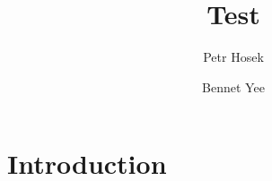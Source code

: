 \documentclass{article}
\begin{document}
\title{Test}
\author{Petr Hosek \and Bennet Yee}
\maketitle
\section*{Introduction}
\end{document}
